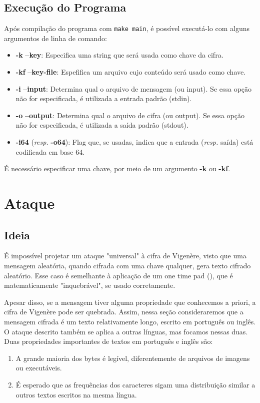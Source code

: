 \documentclass[conference]{IEEEtran}
\begin{document}
\subsection{Execução do Programa}
\label{sec:exec-main}
Após compilação do programa com \verb|make main|, é possível executá-lo com
alguns argumentos de linha de comando:

\begin{itemize}
    \item \textbf{-k} \textbf{--key}: Especifica uma string que será usada como
        chave da cifra.
    \item \textbf{-kf} \textbf{--key-file}: Espefifica um arquivo cujo conteúdo
        será usado como chave.
    \item \textbf{-i} \textbf{--input}: Determina qual o arquivo de mensagem (ou
        input). Se essa opção não for especificada, é utilizada a entrada padrão
        (stdin).
    \item \textbf{-o} \textbf{--output}: Determina qual o arquivo de cifra (ou
        output). Se essa opção não for especificada, é utilizada a saída padrão
        (stdout).
    \item \textbf{-i64} (\textit{resp.} \textbf{-o64}): Flag que, se usadas,
        indica que a entrada (\textit{resp.} saída) está codificada em base 64.
\end{itemize}

É necessário especificar uma chave, por meio de um argumento \textbf{-k} ou
\textbf{-kf}.


\section{Ataque} %
\label{sec:attack}

\subsection{Ideia}
É impossível projetar um ataque "universal" à cifra de Vigenère, visto que uma
mensagem aleatória, quando cifrada com uma chave qualquer, gera texto cifrado
aleatório. Esse caso é semelhante à aplicação de um one time pad
(\cite{one-time-pad}), que é matematicamente "inquebrável", se usado
corretamente.

Apesar disso, se a mensagem tiver alguma propriedade que conhecemos a priori, a
cifra de Vigenère pode ser quebrada. Assim, nessa seção consideraremos que a
mensagem cifrada é um texto relativamente longo, escrito em português ou inglês.
O ataque descrito também se aplica a outras línguas, mas focamos nessas duas.
Duas propriedades importantes de textos em português e inglês são:
\begin{enumerate}
    \item A grande maioria dos bytes é legível, diferentemente de arquivos de
        imagens ou executáveis.
    \item É esperado que as frequências dos caracteres sigam uma distribuição
        similar a outros textos escritos na mesma língua.
\end{enumerate}
\end{document}
